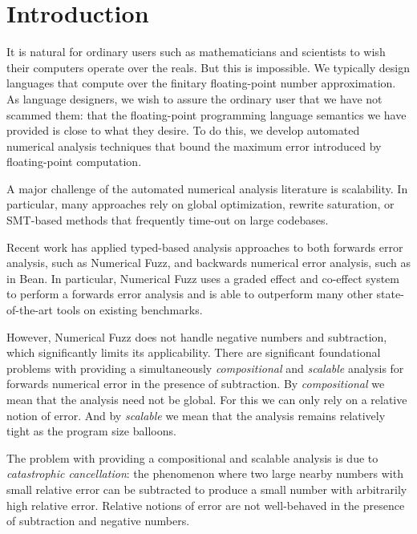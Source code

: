 \section{Introduction}

It is natural for ordinary users such as mathematicians and scientists to wish
their computers operate over the reals. But this is impossible. We typically
design languages that compute over the finitary floating-point number
approximation.
As language designers, we wish to assure the ordinary user that we have not
scammed them: that the floating-point programming language semantics we have
provided is close to what they desire. 
To do this, we develop automated numerical analysis techniques that bound the
maximum error introduced by floating-point computation.


A major challenge of the automated numerical analysis literature is scalability.
In particular, many approaches rely on global optimization, %
rewrite saturation, %
or SMT-based methods %
that frequently time-out on large codebases. 

Recent work has applied typed-based analysis approaches to both forwards error
analysis, such as Numerical Fuzz, and backwards numerical error analysis, such
as in Bean. %
In particular, Numerical Fuzz uses a graded effect and co-effect system to
perform a forwards error analysis and is able to outperform many other
state-of-the-art tools on existing benchmarks.

However, Numerical Fuzz does not handle negative numbers and subtraction, which
significantly limits its applicability. There are significant foundational
problems with providing a simultaneously \textit{compositional} and
\textit{scalable} analysis for forwards numerical error in the presence of
subtraction. By \textit{compositional} we mean that the analysis need not be
global. For this we can only rely on a relative notion of error. And by
\textit{scalable} we mean that the analysis remains relatively tight as the
program size balloons.

The problem with providing a compositional and scalable analysis is due to
\textit{catastrophic cancellation}: the phenomenon where two large nearby
numbers with small relative error can be subtracted to produce a small number
with arbitrarily high relative error. Relative notions of error are not
well-behaved in the presence of subtraction and negative numbers. 

